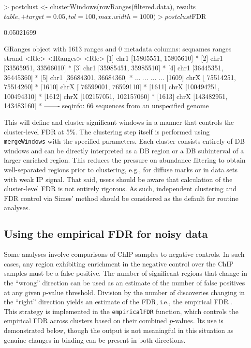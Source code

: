 \documentclass[12pt]{report}
\renewenvironment{Schunk}{\vspace{0pt}}{\vspace{0pt}}
\newcommand{\code}[1]{{\small\texttt{#1}}}
\begin{document}
\begin{Schunk}
\begin{Sinput}
> postclust <- clusterWindows(rowRanges(filtered.data), results$table,
+     target=0.05, tol=100, max.width=1000)
> postclust$FDR
\end{Sinput}
\begin{Soutput}
[1] 0.05021699
\end{Soutput}
\begin{Soutput}
GRanges object with 1613 ranges and 0 metadata columns:
         seqnames                 ranges strand
            <Rle>              <IRanges>  <Rle>
     [1]     chr1   [15805551, 15805610]      *
     [2]     chr1   [33565951, 33566010]      *
     [3]     chr1   [35985451, 35985510]      *
     [4]     chr1   [36445351, 36445360]      *
     [5]     chr1   [36684301, 36684360]      *
     ...      ...                    ...    ...
  [1609]     chrX [ 75514251,  75514260]      *
  [1610]     chrX [ 76599001,  76599110]      *
  [1611]     chrX [100494251, 100494310]      *
  [1612]     chrX [102157051, 102157060]      *
  [1613]     chrX [143482951, 143483160]      *
  -------
  seqinfo: 66 sequences from an unspecified genome
\end{Soutput}
\end{Schunk}

This will define and cluster significant windows in a manner that controls the cluster-level FDR at 5\%.
The clustering step itself is performed using \code{mergeWindows} with the specified parameters.
Each cluster consists entirely of DB windows and can be directly interpreted as a DB region or a DB subinterval of a larger enriched region.
This reduces the pressure on abundance filtering to obtain well-separated regions prior to clustering, e.g., for diffuse marks or in data sets with weak IP signal.
That said, users should be aware that calculation of the cluster-level FDR is not entirely rigorous.
As such, independent clustering and FDR control via Simes' method should be considered as the default for routine analyses.

\subsection{Using the empirical FDR for noisy data}
Some analyses involve comparisons of ChIP samples to negative controls.
In such cases, any region exhibiting enrichment in the negative control over the ChIP samples must be a false positive.
The number of significant regions that change in the ``wrong'' direction can be used as an estimate of the number of false positives at any given $p$-value threshold.
Division by the number of discoveries changing in the ``right'' direction yields an estimate of the FDR, i.e., the empirical FDR \citep{zhang2008}.
This strategy is implemented in the \code{empiricalFDR} function, which controls the empirical FDR across clusters based on their combined $p$-values.
Its use is demonstrated below, though the output is not meaningful in this situation as genuine changes in binding can be present in both directions.
\end{document}

